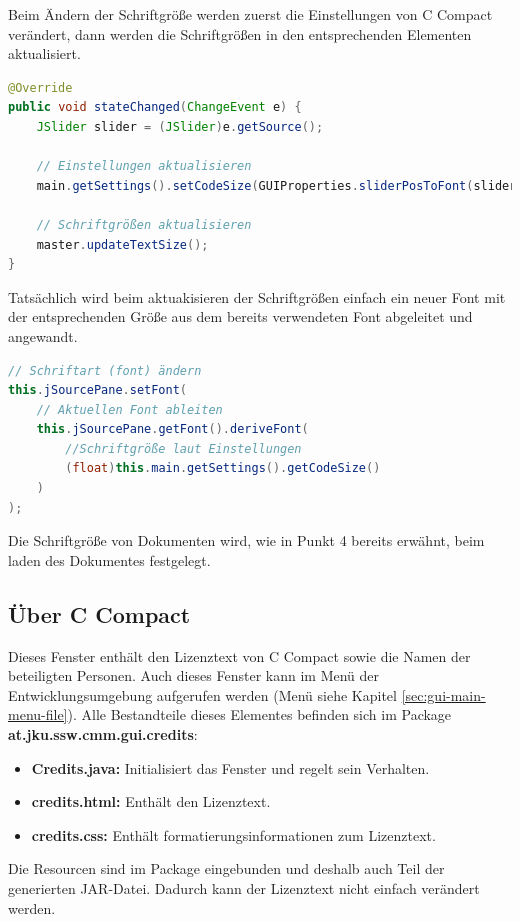 Beim Ändern der Schriftgröße werden zuerst die Einstellungen von C Compact verändert, dann werden die Schriftgrößen in den entsprechenden Elementen aktualisiert.
\begin{lstlisting}[language=JAVA]
@Override
public void stateChanged(ChangeEvent e) {
	JSlider slider = (JSlider)e.getSource();
	
	// Einstellungen aktualisieren
	main.getSettings().setCodeSize(GUIProperties.sliderPosToFont(slider.getValue()));
	
	// Schriftgrößen aktualisieren
	master.updateTextSize();
}
\end{lstlisting}

Tatsächlich wird beim aktuakisieren der Schriftgrößen einfach ein neuer Font mit der entsprechenden Größe aus dem bereits verwendeten Font abgeleitet und angewandt.
\begin{lstlisting}[language=JAVA]
// Schriftart (font) ändern
this.jSourcePane.setFont(
	// Aktuellen Font ableiten
	this.jSourcePane.getFont().deriveFont(
		//Schriftgröße laut Einstellungen
		(float)this.main.getSettings().getCodeSize()
	)
);
\end{lstlisting}

Die Schriftgröße von Dokumenten wird, wie in Punkt 4 bereits erwähnt, beim laden des Dokumentes festgelegt.

\subsection{Über C Compact}
Dieses Fenster enthält den Lizenztext von C Compact sowie die Namen der beteiligten Personen. Auch dieses Fenster kann im Menü der Entwicklungsumgebung aufgerufen werden (Menü siehe Kapitel \ref{sec:gui-main-menu-file}). Alle Bestandteile dieses Elementes befinden sich im Package \textbf{at.jku.ssw.cmm.gui.credits}:
\begin{itemize}
\item \textbf{Credits.java:} Initialisiert das Fenster und regelt sein Verhalten.
\item \textbf{credits.html:} Enthält den Lizenztext.
\item \textbf{credits.css:} Enthält formatierungsinformationen zum Lizenztext.
\end{itemize}

Die Resourcen sind im Package eingebunden und deshalb auch Teil der generierten JAR-Datei. Dadurch kann der Lizenztext nicht einfach verändert werden.

